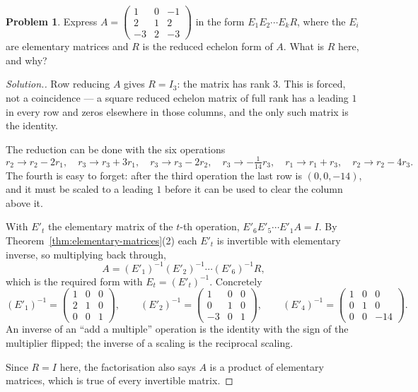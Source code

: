 \documentclass[11pt,a4paper]{article}
\theoremstyle{definition}
\newtheorem{problemx}{Problem}[section]
\newenvironment{problem}{\begin{problemx}}{\end{problemx}}
\newenvironment{solution}
  {\renewcommand{\qedsymbol}{}\begin{proof}[\textit{Solution}.]}
  {\end{proof}}
\begin{document}
\begin{problem}
Express $A=\begin{pmatrix}1&0&-1\\2&1&2\\-3&2&-3\end{pmatrix}$ in the form
$E_1E_2\cdots E_kR$, where the $E_i$ are elementary matrices and $R$ is the
reduced echelon form of $A$. What is $R$ here, and why?
\end{problem}
\begin{solution}
Row reducing $A$ gives $R=I_3$: the matrix has rank $3$. This is forced, not a
coincidence --- a square reduced echelon matrix of full rank has a leading $1$
in every row and zeros elsewhere in those columns, and the only such matrix is
the identity.

The reduction can be done with the six operations
$$r_2\rightarrow r_2-2r_1,\quad r_3\rightarrow r_3+3r_1,\quad
r_3\rightarrow r_3-2r_2,\quad r_3\rightarrow -\tfrac{1}{14}r_3,\quad
r_1\rightarrow r_1+r_3,\quad r_2\rightarrow r_2-4r_3.$$
The fourth is easy to forget: after the third operation the last row is
$(0,0,-14)$, and it must be scaled to a leading $1$ before it can be used to
clear the column above it.

With $E'_t$ the elementary matrix of the $t$-th operation,
$E'_6E'_5\cdots E'_1A=I$. By Theorem~\ref{thm:elementary-matrices}(2) each
$E'_t$ is invertible with elementary inverse, so multiplying back through,
$$A=(E'_1)^{-1}(E'_2)^{-1}\cdots (E'_6)^{-1}R,$$
which is the required form with $E_t=(E'_t)^{-1}$. Concretely
$$(E'_1)^{-1}=\begin{pmatrix}1&0&0\\2&1&0\\0&0&1\end{pmatrix},\qquad
  (E'_2)^{-1}=\begin{pmatrix}1&0&0\\0&1&0\\-3&0&1\end{pmatrix},\qquad
  (E'_4)^{-1}=\begin{pmatrix}1&0&0\\0&1&0\\0&0&-14\end{pmatrix}.$$
An inverse of an ``add a multiple'' operation is the identity with the sign of
the multiplier flipped; the inverse of a scaling is the reciprocal scaling.

Since $R=I$ here, the factorisation also says $A$ is a product of elementary
matrices, which is true of every invertible matrix.
\end{solution}
\end{document}
